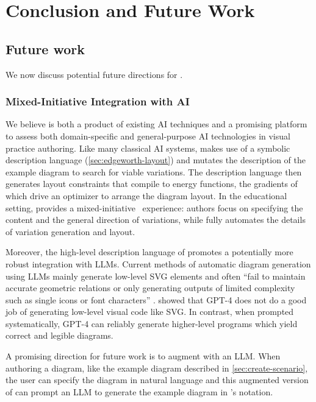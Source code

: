\chapter{Conclusion and Future Work}
\label{chp:conclusion}

\section{Future work}

We now discuss potential future directions for \Edgeworth. 

\subsection{Mixed-Initiative Integration with AI}

We believe \Edgeworth is both a product of existing AI techniques and a promising platform to assess both domain-specific and general-purpose AI technologies in visual practice authoring. Like many classical AI systems, \Edgeworth makes use of a symbolic description language (\cref{sec:edgeworth-layout}) and mutates the description of the example diagram to search for viable variations. The description language then generates layout constraints that compile to energy functions, the gradients of which drive an optimizer to arrange the diagram layout. In the educational setting, \Edgeworth provides a mixed-initiative~\cite{allen1999mixedinitiative} experience: authors focus on specifying the content and the general direction of variations, while \Edgeworth fully automates the details of variation generation and layout. 

Moreover, the high-level description language of \Edgeworth promotes a potentially more robust integration with LLMs. Current methods of automatic diagram generation using LLMs mainly generate low-level SVG elements and often ``fail to maintain accurate geometric relations or only generating outputs of limited complexity such as single icons or font characters'' \cite{belouadi2024automatikz}. \citet{penrosellm} showed that GPT-4 does not do a good job of generating low-level visual code like SVG. In contrast, when prompted systematically, GPT-4 can reliably generate higher-level \Penrose programs which yield correct and legible diagrams.

A promising direction for future work is to augment \Edgeworth with an LLM. When authoring a diagram, like the example diagram described in \cref{sec:create-scenario}, the \Edgeworth user can specify the diagram in natural language and this augmented version of \Edgeworth can prompt an LLM to generate the example diagram in \Edgeworth's notation. 


